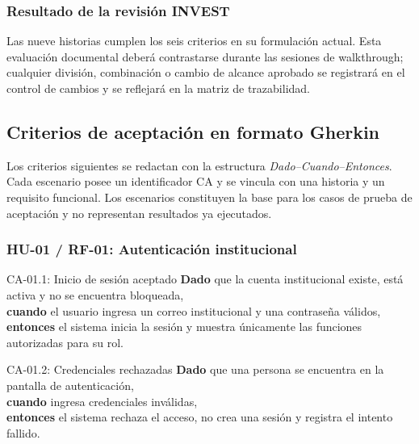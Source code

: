 \documentclass[12pt,a4paper]{article}
\begin{document}
\subsubsection{Resultado de la revisión INVEST}

Las nueve historias cumplen los seis criterios en su formulación actual. Esta evaluación documental deberá contrastarse durante las sesiones de walkthrough; cualquier división, combinación o cambio de alcance aprobado se registrará en el control de cambios y se reflejará en la matriz de trazabilidad.

\subsection{Criterios de aceptación en formato Gherkin}
\label{sec:criterios-gherkin}

Los criterios siguientes se redactan con la estructura \emph{Dado--Cuando--Entonces}. Cada escenario posee un identificador CA y se vincula con una historia y un requisito funcional. Los escenarios constituyen la base para los casos de prueba de aceptación y no representan resultados ya ejecutados.

\subsubsection{HU-01 / RF-01: Autenticación institucional}

\begin{GherkinBox}{CA-01.1: Inicio de sesión aceptado}
\textbf{Dado} que la cuenta institucional existe, está activa y no se encuentra bloqueada,\\
\textbf{cuando} el usuario ingresa un correo institucional y una contraseña válidos,\\
\textbf{entonces} el sistema inicia la sesión y muestra únicamente las funciones autorizadas para su rol.
\end{GherkinBox}

\begin{GherkinBox}{CA-01.2: Credenciales rechazadas}
\textbf{Dado} que una persona se encuentra en la pantalla de autenticación,\\
\textbf{cuando} ingresa credenciales inválidas,\\
\textbf{entonces} el sistema rechaza el acceso, no crea una sesión y registra el intento fallido.
\end{GherkinBox}
\end{document}

